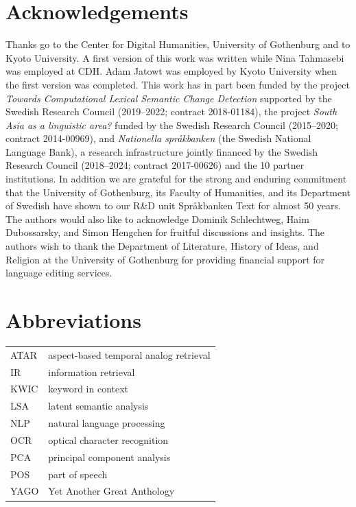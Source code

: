 \documentclass[output=paper%
]{langsci/langscibook}
\begin{document}
\section*{Acknowledgements}
Thanks go to the Center for Digital Humanities, University of Gothenburg and to Kyoto University. A first version of this work was written while Nina Tahmasebi was employed at CDH. Adam Jatowt was employed by Kyoto University when the first version was completed. This work has in part been funded by the project \textit{Towards Computational Lexical Semantic Change Detection} supported  by the Swedish Research Council (2019–2022; contract 2018-01184), the project \emph{South Asia as a linguistic area?} funded by the Swedish Research Council (2015--2020; contract 2014-00969), and \emph{Nationella språkbanken} (the Swedish National Language Bank), a research infrastructure jointly financed  by the Swedish Research Council (2018--2024; contract 2017-00626) and the 10 partner institutions. In
addition we are grateful for the strong and enduring commitment that the
University of Gothenburg, its Faculty of Humanities, and its
Department of Swedish have shown to our R\&D unit Språkbanken Text for
almost 50 years. 
The authors would also like to acknowledge Dominik Schlechtweg, Haim Dubossarsky, and Simon Hengchen for fruitful discussions and insights.  
The authors wish to thank the Department of Literature, History of Ideas, and Religion at the University of Gothenburg for providing financial support for language editing services.


\section*{Abbreviations}
\begin{tabularx}{\textwidth}{@{}lQ@{}}
ATAR & aspect-based temporal analog retrieval\\
IR & information retrieval\\
KWIC & keyword in context\\
LSA & latent semantic analysis\\
NLP & natural language processing\\
OCR & optical character recognition\\
PCA & principal component analysis\\
POS & part of speech\\
YAGO & Yet Another Great Anthology\\
\end{tabularx}


{\sloppy\printbibliography[heading=subbibliography,notkeyword=this]}
\end{document}
